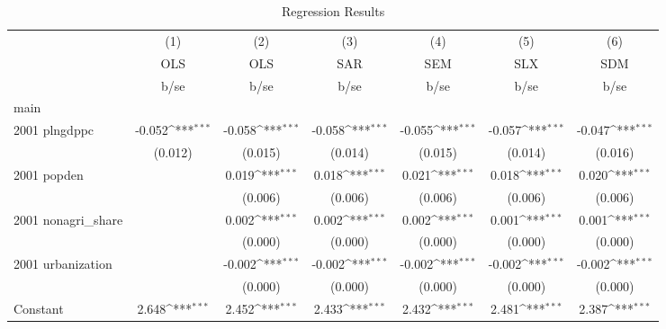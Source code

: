 \begin{table}[htbp]\centering
\def\sym#1{\ifmmode^{#1}\else\(^{#1}\)\fi}
\caption{Regression Results}
\begin{tabular}{l*{6}{c}}
\hline\hline
                    &\multicolumn{1}{c}{(1)}&\multicolumn{1}{c}{(2)}&\multicolumn{1}{c}{(3)}&\multicolumn{1}{c}{(4)}&\multicolumn{1}{c}{(5)}&\multicolumn{1}{c}{(6)}\\
                    &\multicolumn{1}{c}{OLS}&\multicolumn{1}{c}{OLS}&\multicolumn{1}{c}{SAR}&\multicolumn{1}{c}{SEM}&\multicolumn{1}{c}{SLX}&\multicolumn{1}{c}{SDM}\\
                    &        b/se         &        b/se         &        b/se         &        b/se         &        b/se         &        b/se         \\
\hline
main                &                     &                     &                     &                     &                     &                     \\
2001 plngdppc       &      -0.052\sym{***}&      -0.058\sym{***}&      -0.058\sym{***}&      -0.055\sym{***}&      -0.057\sym{***}&      -0.047\sym{***}\\
                    &     (0.012)         &     (0.015)         &     (0.014)         &     (0.015)         &     (0.014)         &     (0.016)         \\
2001 popden         &                     &       0.019\sym{***}&       0.018\sym{***}&       0.021\sym{***}&       0.018\sym{***}&       0.020\sym{***}\\
                    &                     &     (0.006)         &     (0.006)         &     (0.006)         &     (0.006)         &     (0.006)         \\
2001 nonagri\_share  &                     &       0.002\sym{***}&       0.002\sym{***}&       0.002\sym{***}&       0.001\sym{***}&       0.001\sym{***}\\
                    &                     &     (0.000)         &     (0.000)         &     (0.000)         &     (0.000)         &     (0.000)         \\
2001 urbanization   &                     &      -0.002\sym{***}&      -0.002\sym{***}&      -0.002\sym{***}&      -0.002\sym{***}&      -0.002\sym{***}\\
                    &                     &     (0.000)         &     (0.000)         &     (0.000)         &     (0.000)         &     (0.000)         \\
Constant            &       2.648\sym{***}&       2.452\sym{***}&       2.433\sym{***}&       2.432\sym{***}&       2.481\sym{***}&       2.387\sym{***}\\

\end{tabular}
\end{table}
